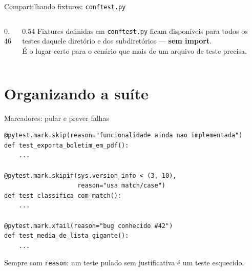 \documentclass[aspectratio=169]{beamer}
\begin{document}
\begin{frame}[fragile]{Compartilhando fixtures: \texttt{conftest.py}}
  \begin{columns}[T]
    \begin{column}{0.46\textwidth}
      \begin{center}
      \end{center}
    \end{column}
    \begin{column}{0.54\textwidth}
      \small
      Fixtures definidas em \texttt{conftest.py} ficam disponíveis para
      todos os testes daquele diretório e dos subdiretórios ---
      \textbf{sem import}.
      \\[0.5em]
      É o lugar certo para o cenário que mais de um arquivo de teste
      precisa.
    \end{column}
  \end{columns}
\end{frame}

\section{Organizando a suíte}

\begin{frame}[fragile]{Marcadores: pular e prever falhas}
\begin{lstlisting}
@pytest.mark.skip(reason="funcionalidade ainda nao implementada")
def test_exporta_boletim_em_pdf():
    ...

@pytest.mark.skipif(sys.version_info < (3, 10),
                    reason="usa match/case")
def test_classifica_com_match():
    ...

@pytest.mark.xfail(reason="bug conhecido #42")
def test_media_de_lista_gigante():
    ...
\end{lstlisting}
  \small Sempre com \texttt{reason}: um teste pulado sem justificativa
  é um teste esquecido.
\end{frame}
\end{document}

